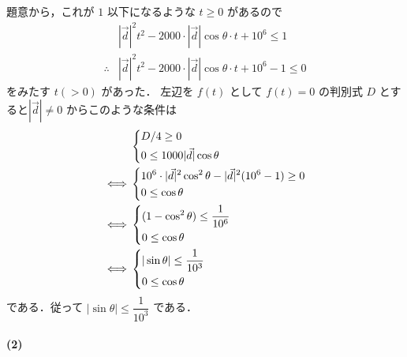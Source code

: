 \documentclass[../../main.tex]{subfiles}
\begin{document}
題意から，これが $1$ 以下になるような $t \ge 0$ があるので
\begin{align}
  & |\vec{d}|^2 t^2 - 2000 \cdot |\vec{d}| \cos \theta \cdot t + 10^6 \le 1 \\
  \therefore
  & |\vec{d}|^2 t^2 - 2000 \cdot |\vec{d}| \cos \theta \cdot t + 10^6 - 1 \le 0
\end{align}
をみたす $t (>0)$ があった．
左辺を $f(t)$ として $f(t)=0$ の判別式 $D$ とすると$|\vec{d}| \ne 0$ からこのような条件は
\begin{align}
  &
  \begin{dcases}
    D/4 \ge 0 \\
    0 \le 1000 |\vec{d}| \cos \theta
  \end{dcases} \\
  \iff
  &
  \begin{dcases}
    10^6 \cdot |\vec{d}|^2 \cos^2 \theta - |\vec{d}|^2 (10^6-1) \ge 0 \\
    0 \le \cos \theta
  \end{dcases} \\
  \iff
  &
  \begin{dcases}
    (1-\cos^2 \theta) \le \dfrac{1}{10^6} \\
    0 \le \cos \theta
  \end{dcases} \\
  \iff
  &
  \begin{dcases}
    |\sin \theta| \le \dfrac{1}{10^3} \\
    0 \le \cos \theta
  \end{dcases} \label{eq:2}
\end{align}
である．従って $|\sin \theta| \le \dfrac{1}{10^3}$ である．

\paragraph{(2)}
\end{document}
